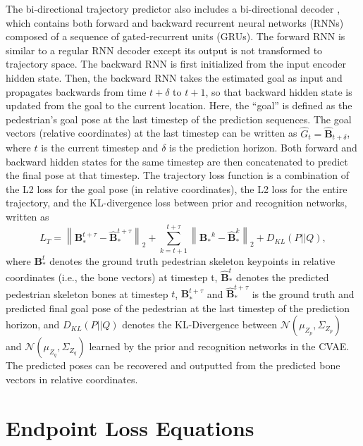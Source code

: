 \documentclass[nohyperref]{article}
\theoremstyle{plain}
\theoremstyle{definition}
\theoremstyle{remark}
\begin{document}
The bi-directional trajectory predictor also includes a bi-directional decoder \cite{yao2021bitrap}, which contains both forward and backward recurrent neural networks (RNNs) composed of a sequence of gated-recurrent units (GRUs). The forward RNN is similar to a regular RNN decoder except its output is not transformed to trajectory space. The backward RNN is first initialized from the input encoder hidden state. Then, the backward RNN takes the estimated goal as input and propagates backwards from time $t+\delta$ to $t+1$, so that backward hidden state is updated from the goal to the current location. Here, the ``goal''  is defined as the pedestrian's goal pose at the last timestep of the prediction sequences. The goal vectors (relative coordinates) at the last timestep can be written as $\hat{G}_{t} = \hat{\mathbf{B}}_{t+\delta}$, where $t$ is the current timestep and $\delta$ is the prediction horizon.
 Both forward and backward hidden states for the same timestep are then concatenated to predict the final pose at that timestep. The trajectory loss function is a combination of the L2 loss  for the goal pose (in relative coordinates), the L2 loss for the entire trajectory, and the KL-divergence loss between
prior and recognition networks, written as   
\begin{equation}
\label{eqn:trajectoryloss}
L_{T} = \left \| {\mathbf{B}}_*^{t+\tau} -  \hat{\mathbf{B}}_*^{t+\tau} \right \|_2 + \sum_{k=t+1}^{t+\tau} \left \| {\mathbf{B}_*}^{k} -  \hat{\mathbf{B}}_*^{k} \right \|_2 + D_{KL}(P||Q),
\end{equation}
where $\mathbf{B}_*^{t}$ denotes the ground truth pedestrian skeleton keypoints in relative coordinates (i.e., the bone vectors) at timestep t,  $\hat{\mathbf{B}}_*^{t}$ denotes the predicted pedestrian skeleton bones at timestep $t$, $\mathbf{B}_*^{t+\tau}$ and $\hat{\mathbf{B}}_*^{t+\tau}$ is the ground truth and predicted final goal pose of the pedestrian at the last timestep of the prediction horizon, and $D_{KL}(P||Q)$ denotes the KL-Divergence between $\mathcal{N}(\mu_{Z_p}, \Sigma_{Z_p})$ and $\mathcal{N}(\mu_{Z_q},\Sigma_{Z_q})$ learned by the prior and recognition networks in the CVAE. The predicted poses can be recovered and outputted from the  predicted bone vectors in relative coordinates.



\section{Endpoint Loss Equations}
\label{appendix:endpoint_loss_equations}
\end{document}
